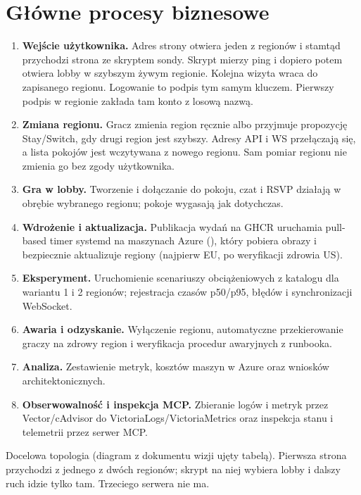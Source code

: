 \section{Główne procesy biznesowe}
\begin{enumerate}[label=\textbf{P\arabic*.},leftmargin=2.2em]
  \item \textbf{Wejście użytkownika.} Adres strony otwiera jeden z regionów
        i stamtąd przychodzi strona ze skryptem sondy. Skrypt mierzy ping i dopiero
        potem otwiera lobby w szybszym żywym regionie. Kolejna wizyta wraca do
        zapisanego regionu. Logowanie to podpis tym samym kluczem.
        Pierwszy podpis w regionie zakłada tam konto z losową nazwą.
  \item \textbf{Zmiana regionu.} Gracz zmienia region ręcznie albo przyjmuje
        propozycję Stay/Switch, gdy drugi region jest szybszy. Adresy API i WS
        przełączają się, a lista pokojów jest wczytywana z nowego regionu. Sam pomiar
        regionu nie zmienia go bez zgody użytkownika.
  \item \textbf{Gra w lobby.} Tworzenie i dołączanie do pokoju, czat i RSVP
        działają w obrębie wybranego regionu; pokoje wygasają jak dotychczas.
  \item \textbf{Wdrożenie i aktualizacja.} Publikacja wydań na GHCR uruchamia
        pull-based timer systemd na maszynach Azure (), który
        pobiera obrazy i bezpiecznie aktualizuje regiony (najpierw EU, po weryfikacji
        zdrowia US).
  \item \textbf{Eksperyment.} Uruchomienie scenariuszy obciążeniowych z katalogu
         dla wariantu 1 i 2 regionów; rejestracja czasów
        p50/p95, błędów i synchronizacji WebSocket.
  \item \textbf{Awaria i odzyskanie.} Wyłączenie regionu, automatyczne
        przekierowanie graczy na zdrowy region i weryfikacja procedur awaryjnych z
        runbooka.
  \item \textbf{Analiza.} Zestawienie metryk, kosztów maszyn w Azure oraz wniosków
        architektonicznych.
  \item \textbf{Obserwowalność i inspekcja MCP.} Zbieranie logów i metryk przez
        Vector/cAdvisor do VictoriaLogs/VictoriaMetrics oraz inspekcja stanu i
        telemetrii przez serwer MCP.
\end{enumerate}

Docelowa topologia (diagram z dokumentu wizji ujęty tabelą). Pierwsza strona
przychodzi z jednego z dwóch regionów; skrypt na niej wybiera lobby i dalszy ruch
idzie tylko tam. Trzeciego serwera nie ma.

